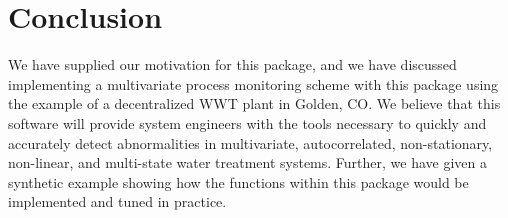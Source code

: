 \documentclass{report}\usepackage[]{graphicx}\usepackage[]{color}
\begin{document}
\section{Conclusion} \label{sec:D_Conclusion}
We have supplied our motivation for this package, and we have discussed implementing a multivariate process monitoring scheme with this package using the example of a decentralized WWT plant in Golden, CO. We believe that this software will provide system engineers with the tools necessary to quickly and accurately detect abnormalities in multivariate, autocorrelated, non-stationary, non-linear, and multi-state water treatment systems. Further, we have given a synthetic example showing how the functions within this package would be implemented and tuned in practice.
\end{document}
